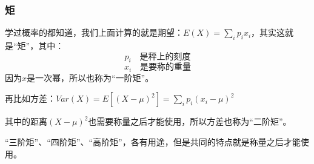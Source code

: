 \documentclass[12pt]{article}
\begin{document}
\subsubsection{矩}
学过概率的都知道，我们上面计算的就是期望：$E(X) = \sum_ip_ix_i$，其实这就是“矩”，其中：
$$
p_i \quad \textbf{是秤上的刻度}
$$
$$
x_i \quad \textbf{是要称的重量}
$$
因为$x$是一次幂，所以也称为“一阶矩”。

再比如方差：$Var(X) = E[(X-\mu)^2] = \sum_ip_i(x_i-\mu)^2 $

其中的距离$(X-\mu)^2$也需要称量之后才能使用，所以方差也称为“二阶矩”。

“三阶矩”、“四阶矩”、“高阶矩”，各有用途，但是共同的特点就是称量之后才能使用。




\end{document}
